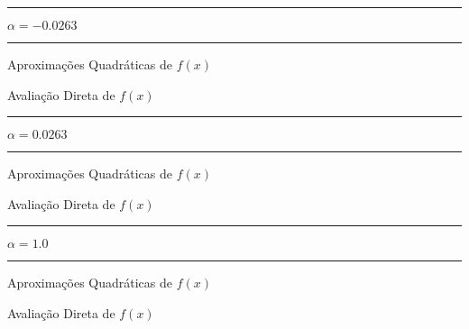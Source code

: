     {\centering
    \hrule
    \vspace{2mm}
    $\alpha = -0.0263$
    \vspace{2mm}
    \noindent
    \hrule 
    \vspace{2mm}}
      
    \begin{minipage}[h!]{\linewidth}
        \centering
        Aproximações Quadráticas de $f(x)$
        \label{tab:tbli} 
        \writetable{\tbli}\par
        \bigskip
        \centering
        Avaliação Direta de $f(x)$
        \label{tab:tblj} 
        \writetable{\tblj}
    \end{minipage}
    \vspace{3mm}

    {\centering
    \hrule
    \vspace{2mm}
    $\alpha = 0.0263$
    \vspace{2mm}
    \noindent
    \hrule 
    \vspace{2mm}}
    
    \begin{minipage}[h!]{\linewidth}
        \centering
        {Aproximações Quadráticas de $f(x)$}
        \label{tab:tblk} 
        \writetable{\tblk}\par
        \bigskip
        \centering
        {Avaliação Direta de $f(x)$}
        \label{tab:tbll} 
        \writetable{\tbll}
    \end{minipage}
    \vspace{3mm}

    {\centering
    \hrule
    \vspace{2mm}
    $\alpha = 1.0$
    \vspace{2mm}
    \noindent
    \hrule 
    \vspace{2mm}}
    
    \begin{minipage}[h!]{\linewidth}
        \centering
        {Aproximações Quadráticas de $f(x)$}
        \label{tab:tblm} 
        \writetable{\tblm}\par
        \bigskip
        \centering
        {Avaliação Direta de $f(x)$}
        \label{tab:tbln} 
        \writetable{\tbln}     
    \end{minipage}
    \vspace{3mm}

